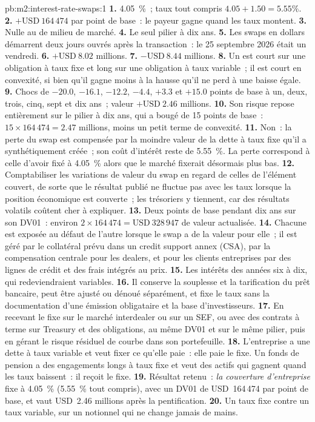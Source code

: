 \begin{solution}{pb:m2:interest-rate-swaps:1}
\textbf{1.} 4.05~\%~; taux tout compris $4.05 + 1.50 = 5.55\%$.
\textbf{2.} $+\text{USD}~164\,474$ par point de base~: le payeur gagne quand les taux montent.
\textbf{3.} Nulle au  de milieu de marché.
\textbf{4.} Le seul pilier à dix ans.
\textbf{5.} Les swaps en dollars démarrent deux jours ouvrés après la transaction~: le 25 septembre
2026 était un vendredi.
\textbf{6.} $+\text{USD}~8.02$ millions.
\textbf{7.} $-\text{USD}~8.44$ millions.
\textbf{8.} Un  est court sur une obligation à taux fixe et long sur une obligation à taux variable~; il
est court en convexité, si bien qu'il gagne moins à la hausse qu'il ne perd à une baisse égale.
\textbf{9.} Chocs de $-20.0$, $-16.1$, $-12.2$, $-4.4$, $+3.3$ et $+15.0$ points de base à
un, deux, trois, cinq, sept et dix ans~; valeur $+\text{USD}~2.46$ millions.
\textbf{10.} Son risque repose entièrement sur le pilier à dix ans, qui a bougé de 15 points
de base~: $15 \times 164\,474 = 2.47$ millions, moins un petit terme de convexité.
\textbf{11.} Non~: la perte du swap est compensée par la moindre valeur de la dette à taux
fixe qu'il a synthétiquement créée~; son coût d'intérêt reste de 5.55~\%. La perte
correspond à celle d'avoir fixé à 4.05~\% alors que le marché fixerait désormais plus bas.
\textbf{12.} Comptabiliser les variations de valeur du swap en regard de celles de l'élément couvert, de sorte
que le résultat publié ne fluctue pas avec les taux lorsque la position économique est
couverte~; les trésoriers y tiennent, car des résultats volatils coûtent cher à expliquer.
\textbf{13.} Deux points de base pendant dix ans sur son DV01~: environ $2 \times 164\,474 =
\text{USD}~328\,947$ de valeur actualisée.
\textbf{14.} Chacune est exposée au défaut de l'autre lorsque le swap a de la valeur pour
elle~; il est géré par le collatéral prévu dans un credit support annex (CSA), par la compensation centrale
pour les dealers, et pour les clients entreprises par des lignes de crédit et des frais
intégrés au prix.
\textbf{15.} Les intérêts des années six à dix, qui redeviendraient variables.
\textbf{16.} Il conserve la souplesse et la tarification du prêt bancaire, peut être ajusté ou
dénoué séparément, et fixe le taux sans la documentation d'une émission obligataire
et la base d'investisseurs.
\textbf{17.} En recevant le fixe sur le marché interdealer ou sur un SEF, ou avec
des contrats à terme sur Treasury et des obligations, au même DV01 et sur le même pilier, puis en gérant le
risque résiduel de courbe dans son portefeuille.
\textbf{18.} L'entreprise a une dette à taux variable et veut fixer ce qu'elle paie~: elle paie
le fixe. Un fonds de pension a des engagements longs à taux fixe et veut des actifs qui gagnent
quand les taux baissent~: il reçoit le fixe.
\textbf{19.} Résultat retenu~: \emph{la couverture d'entreprise} fixe à 4.05~\% (5.55~\% tout compris),
avec un DV01 de USD~164\,474 par point de base, et vaut USD~2.46 millions après la
pentification.
\textbf{20.} Un taux fixe contre un taux variable, sur un notionnel qui ne change jamais
de mains.
\end{solution}

